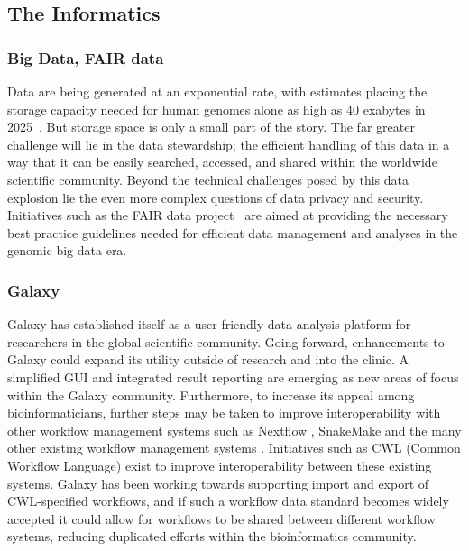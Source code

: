 \subsection{The Informatics}
\subsubsection{Big Data, FAIR data}
Data are being generated at an exponential rate, with estimates placing the storage capacity needed for human genomes alone as high as 40 exabytes in 2025~\cite{stephens2015}.
But storage space is only a small part of the story. The far greater challenge will lie in the data stewardship; the efficient handling of this data in a way that it can be easily searched, accessed, and shared within the worldwide scientific community.
Beyond the technical challenges posed by this data explosion lie the even more complex questions of data privacy and security. Initiatives such as the FAIR data project~\cite{wilkinson2016fair} are aimed at providing the necessary best practice guidelines needed for efficient data management and analyses in the genomic big data era.

\subsubsection{Galaxy}
Galaxy has established itself as a user-friendly data analysis platform for researchers in the global scientific community. Going forward, enhancements to Galaxy could expand its utility outside of research and into the clinic. A simplified GUI and integrated result reporting are emerging as new areas of focus within the Galaxy community.
Furthermore, to increase its appeal among bioinformaticians, further steps may be taken to improve interoperability with other workflow management systems such as Nextflow \cite{di2017nextflow}, SnakeMake \cite{koster2012snakemake} and the many other existing workflow management systems \cite{workflow-engines}. Initiatives such as CWL (Common Workflow Language) \cite{amstutz2016common} exist to improve interoperability between these existing systems. Galaxy has been working towards supporting import and export of CWL-specified workflows, and if such a workflow data standard becomes widely accepted it could allow for workflows to be shared between different workflow systems, reducing duplicated efforts within the bioinformatics community.

